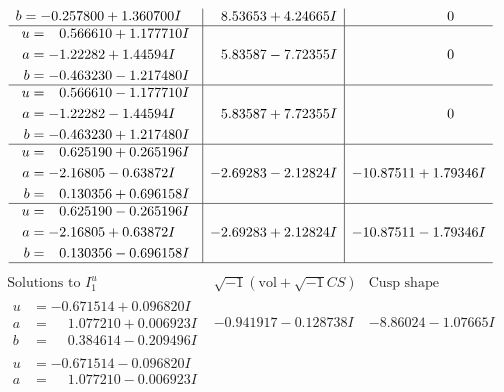 \documentclass[1p]{elsarticle_modified}
\theoremstyle{definition}
\newcommand{\I}{\sqrt{-1}}
\begin{document}
$$\begin{array}{c|c|c}
\begin{aligned}
b &= -0.257800 + 1.360700 I\end{aligned}
 & \phantom{-}8.53653 + 4.24665 I & \phantom{-0.000000 } 0 \\ \hline\begin{aligned}
u &= \phantom{-}0.566610 + 1.177710 I \\
a &= -1.22282 + 1.44594 I \\
b &= -0.463230 - 1.217480 I\end{aligned}
 & \phantom{-}5.83587 - 7.72355 I & \phantom{-0.000000 } 0 \\ \hline\begin{aligned}
u &= \phantom{-}0.566610 - 1.177710 I \\
a &= -1.22282 - 1.44594 I \\
b &= -0.463230 + 1.217480 I\end{aligned}
 & \phantom{-}5.83587 + 7.72355 I & \phantom{-0.000000 } 0 \\ \hline\begin{aligned}
u &= \phantom{-}0.625190 + 0.265196 I \\
a &= -2.16805 - 0.63872 I \\
b &= \phantom{-}0.130356 + 0.696158 I\end{aligned}
 & -2.69283 - 2.12824 I & -10.87511 + 1.79346 I \\ \hline\begin{aligned}
u &= \phantom{-}0.625190 - 0.265196 I \\
a &= -2.16805 + 0.63872 I \\
b &= \phantom{-}0.130356 - 0.696158 I\end{aligned}
 & -2.69283 + 2.12824 I & -10.87511 - 1.79346 I\\
 \hline 
 \end{array}$$\newpage$$\begin{array}{c|c|c}  
\text{Solutions to }I^u_{1}& \I (\text{vol} + \sqrt{-1}CS) & \text{Cusp shape}\\
 \hline 
\begin{aligned}
u &= -0.671514 + 0.096820 I \\
a &= \phantom{-}1.077210 + 0.006923 I \\
b &= \phantom{-}0.384614 - 0.209496 I\end{aligned}
 & -0.941917 - 0.128738 I & -8.86024 - 1.07665 I \\ \hline\begin{aligned}
u &= -0.671514 - 0.096820 I \\
a &= \phantom{-}1.077210 - 0.006923 I \\

\end{aligned}
\end{array}$$
\end{document}

